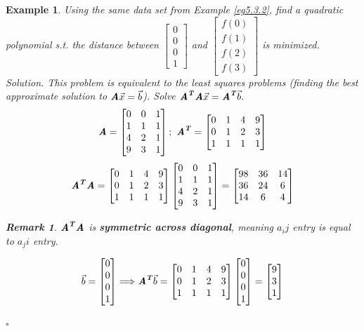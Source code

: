 \documentclass[12pt, a4paper]{article}
\newtheorem{eg}{Example}[subsection]
\newenvironment*{sol}{\indent\textit{Solution. }}{\hfill{$\square$}\par}
\newtheorem*{rmk}{\indent Remark}
\def\T{{\textbf{\emph{T}}}}
\def\vecx{\vec{x}}
\def\vecb{\vec{b}}
\def\matrixA{\textbf{\emph{A}}}
\begin{document}
\begin{eg}
	Using the same data set from Example \ref{eg5.3.2}, find a quadratic polynomial \emph{s.t.} the distance between $\begin{bmatrix}0\\0\\0\\1\end{bmatrix}$ and $\begin{bmatrix}f(0)\\f(1)\\f(2)\\f(3)\end{bmatrix}$ is minimized. \\
	\begin{sol}
		This problem is equivalent to the least squares problems (finding the best approximate solution to $\matrixA\vecx=\vecb$). Solve $\matrixA^\T\matrixA\vecx=\matrixA^\T\vecb.$
		\[\matrixA=\begin{bmatrix}0&0&1\\1&1&1\\4&2&1\\9&3&1\end{bmatrix};\ \matrixA^\T=\begin{bmatrix}0&1&4&9\\0&1&2&3\\1&1&1&1\end{bmatrix}\]
		\[\matrixA^\T\matrixA=\begin{bmatrix}0&1&4&9\\0&1&2&3\\1&1&1&1\end{bmatrix}\begin{bmatrix}0&0&1\\1&1&1\\4&2&1\\9&3&1\end{bmatrix}=\begin{bmatrix}98&36&14\\36&24&6\\14&6&4\end{bmatrix}\]
		\begin{rmk}
			$\matrixA^\T\matrixA$ is \textbf{symmetric across diagonal}, meaning $a_ij$ entry is equal to $a_ji$ entry. 
		\end{rmk}
		\[\vecb=\begin{bmatrix}0\\0\\0\\1\end{bmatrix}\Longrightarrow\matrixA^\T\vecb=\begin{bmatrix}0&1&4&9\\0&1&2&3\\1&1&1&1\end{bmatrix}\begin{bmatrix}0\\0\\0\\1\end{bmatrix}=\begin{bmatrix}9\\3\\1\end{bmatrix}\]

\end{sol}
\end{eg}
\end{document}
